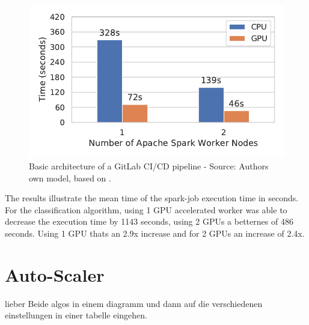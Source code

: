\begin{figure}[h]
\centering
\includegraphics[scale=1]{images/07_evaluation/taxi/taxi_gpu_vs_cpu}
\caption{Basic architecture of a GitLab CI/CD pipeline - Source: Authors own model, based on \cite{Gitlab2020Docs}.}
\label{fig:07_taxi_static-gpu_results}
\end{figure}
The results illustrate the mean time of the spark-job execution time in seconds.
For the classification algorithm, using 1 GPU accelerated worker was able to decrease the execution time by 1143 seconds, using 2 GPUs a betternes of 486 seconds. Using 1 GPU thats an 2.9x increase and for 2 GPUs an increase of 2.4x.


\section{Auto-Scaler}
lieber Beide algos in einem diagramm und dann auf die verschiedenen einstellungen in einer tabelle eingehen.

